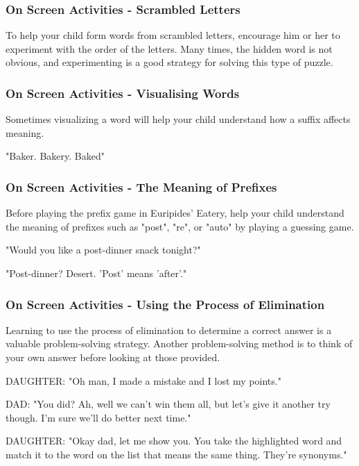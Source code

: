 \subsubsection{On Screen Activities - Scrambled Letters}

To help your child form words from scrambled letters, encourage him or her to experiment with the order of the letters.
Many times, the hidden word is not obvious, and experimenting is a good strategy for solving this type of puzzle.

\subsubsection{On Screen Activities - Visualising Words}

Sometimes visualizing a word will help your child understand how a suffix affects meaning.

"Baker. Bakery. Baked"

\subsubsection{On Screen Activities - The Meaning of Prefixes}

Before playing the prefix game in Euripides' Eatery, help your child understand the meaning of prefixes such as "post", "re", or "auto" by playing a guessing game.

"Would you like a post-dinner snack tonight?"

"Post-dinner? Desert. 'Post' means 'after'."

\subsubsection{On Screen Activities - Using the Process of Elimination}

Learning to use the process of elimination to determine a correct answer is a valuable problem-solving strategy.
Another problem-solving method is to think of your own answer before looking at those provided.

DAUGHTER: "Oh man, I made a mistake and I lost my points."

DAD: "You did?
Ah, well we can't win them all, but let's give it another try though.
I'm sure we'll do better next time."

DAUGHTER: "Okay dad, let me show you.
You take the highlighted word and match it to the word on the list that means the same thing.
They're synonyms."

